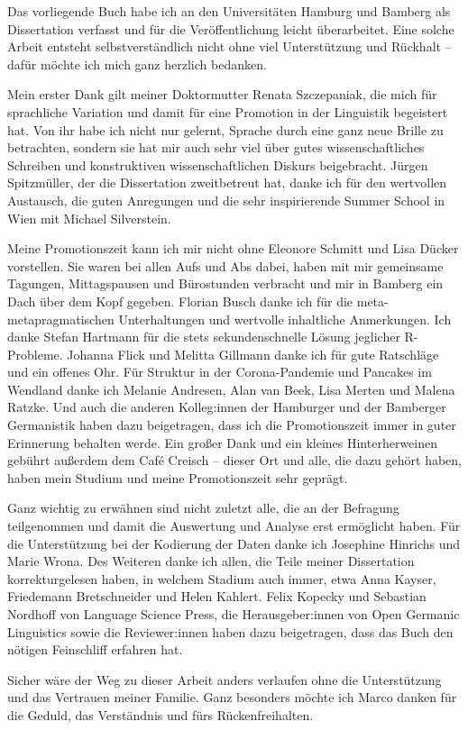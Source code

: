 \addchap{\lsAcknowledgementTitle} 
\markdouble{\lsAcknowledgementTitle}
Das vorliegende Buch habe ich an den Universitäten Hamburg und Bamberg als Dissertation verfasst und für die Veröffentlichung leicht überarbeitet. 
Eine solche Arbeit entsteht selbstverständlich nicht ohne viel Unterstützung und Rückhalt -- dafür möchte ich mich ganz herzlich bedanken. 

Mein erster Dank gilt meiner Doktormutter Renata Szczepaniak, die mich für sprachliche Variation und damit für eine Promotion in der Linguistik begeistert hat. 
Von ihr habe ich nicht nur gelernt, Sprache durch eine ganz neue Brille zu betrachten, sondern sie hat mir auch sehr viel über gutes wissenschaftliches Schreiben und konstruktiven wissenschaftlichen Diskurs beigebracht.
Jürgen Spitzmüller, der die Dissertation zweitbetreut hat, danke ich für den wertvollen Austausch, die guten Anregungen und die sehr inspirierende Summer School in Wien mit Michael Silverstein. 

Meine Promotionszeit kann ich mir nicht ohne Eleonore Schmitt und Lisa Dücker vorstellen. Sie waren bei allen Aufs und Abs dabei, haben mit mir gemeinsame Tagungen, Mittagspausen und Bürostunden verbracht und mir in Bamberg ein Dach über dem Kopf gegeben. 
Florian Busch danke ich für die meta-metapragmatischen Unterhaltungen und wertvolle inhaltliche Anmerkungen. 
Ich danke Stefan Hartmann für die stets sekundenschnelle Lösung jeglicher R-Probleme.
Johanna Flick und Melitta Gillmann danke ich für gute Ratschläge und ein offenes Ohr. 
Für Struktur in der Corona-Pandemie und Pancakes im Wendland danke ich Melanie Andresen, Alan van Beek, Lisa Merten und Malena Ratzke. 
Und auch die anderen Kolleg:innen der Hamburger und der Bamberger Germanistik haben dazu beigetragen, dass ich die Promotionszeit immer in guter Erinnerung behalten werde. 
Ein großer Dank und ein kleines Hinterherweinen gebührt außerdem dem Café Creisch -- dieser Ort und alle, die dazu gehört haben, haben mein Studium und meine Promotionszeit sehr geprägt. 

Ganz wichtig zu erwähnen sind nicht zuletzt alle, die an der Befragung teilgenommen und damit die Auswertung und Analyse erst ermöglicht haben. 
Für die Unterstützung bei der Kodierung der Daten danke ich Josephine Hinrichs und Marie Wrona. 
Des Weiteren danke ich allen, die Teile meiner Dissertation korrekturgelesen haben, in welchem Stadium auch immer, etwa Anna Kayser, Friedemann Bretschneider und Helen Kahlert.
Felix Kopecky und Sebastian Nordhoff von Language Science Press, die Herausgeber:innen von Open Germanic Linguistics sowie die Reviewer:innen haben dazu beigetragen, dass das Buch den nötigen Feinschliff erfahren hat. 

Sicher wäre der Weg zu dieser Arbeit anders verlaufen ohne die Unterstützung und das Vertrauen meiner Familie. 
Ganz besonders möchte ich Marco danken für die Geduld, das Verständnis und fürs Rückenfreihalten. 